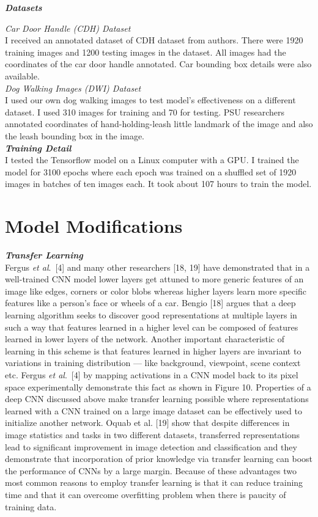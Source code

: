 \documentclass [11pt,letterpaper ,twoside ,openany ]{report}
\begin{document}
    \noindent
    \textbf{\textit{Datasets}}

    \noindent
    \textit{Car Door Handle (CDH) Dataset}\\
    I received an annotated dataset of CDH dataset from authors. There were 1920 training images and 1200 testing images in the dataset. All images had the coordinates of the car door handle annotated. Car bounding box details were also available.\\

    \noindent
    \textit{Dog Walking Images (DWI) Dataset}\\
    I used our own dog walking images to test model's effectiveness on a different dataset. I used 310 images for training and 70 for testing. PSU researchers annotated coordinates of hand-holding-leash little landmark of the image and also the leash bounding box in the image.\\

    \noindent
    \textbf{\textit{Training Detail}}\\
    I tested the Tensorflow model on a Linux computer with a GPU. I trained the model for 3100  epochs where each epoch was trained on a shuffled set of 1920 images in batches of ten images each. It took about 107 hours to train the model.

    \section{Model Modifications}

    \noindent
    \textbf{\textit{Transfer Learning}}\\
    Fergus \textit {et al}.\ [4] and many other researchers [18, 19] have demonstrated that in a well-trained CNN model lower layers get attuned to more generic features of an image like edges, corners or color blobs whereas higher layers learn more specific features like a person's face or wheels of a car. Bengio [18] argues that a deep learning algorithm seeks to discover good representations at multiple layers  in such a way that features learned in a higher level can be composed of features learned in lower layers of the network. Another important characteristic of learning in this scheme is that features learned in higher layers are invariant to variations in training distribution --- like background, viewpoint, scene context etc. Fergus \textit{et al}.\ [4] by mapping activations in a CNN model back to its pixel space experimentally demonstrate this fact as shown in Figure 10. Properties of a deep CNN discussed above make transfer learning possible where representations learned with a CNN trained on a large image dataset can be effectively used to  initialize another network. Oquab et al. [19] show that despite differences in image statistics and tasks in two different datasets, transferred representations lead to significant improvement in image detection and classification and they demonstrate that incorporation of prior knowledge via transfer learning can boost the performance of CNNs by a large margin. Because of these advantages two most common reasons to employ transfer learning is that it can reduce training time and that it can overcome overfitting problem when there is paucity of training data.
\end{document}

